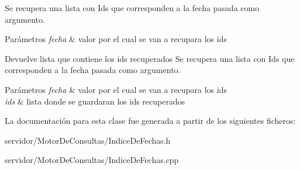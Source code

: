 \-Se recupera una lista con \-Ids que corresponden a la fecha pasada como argumento. 


\begin{DoxyParams}{\-Parámetros}
{\em fecha} & valor por el cual se van a recupara los ids \\
\hline
\end{DoxyParams}
\begin{DoxyReturn}{\-Devuelve}
lista que contiene los ids recuperados \-Se recupera una lista con \-Ids que corresponden a la fecha pasada como argumento. 
\end{DoxyReturn}

\begin{DoxyParams}{\-Parámetros}
{\em fecha} & valor por el cual se van a recupara los ids \\
\hline
{\em ids} & lista donde se guardaran los ids recuperados \\
\hline
\end{DoxyParams}


\-La documentación para esta clase fue generada a partir de los siguientes ficheros\-:\begin{DoxyCompactItemize}
\item 
servidor/\-Motor\-De\-Consultas/\-Indice\-De\-Fechas.\-h\item 
servidor/\-Motor\-De\-Consultas/\-Indice\-De\-Fechas.\-cpp\end{DoxyCompactItemize}
